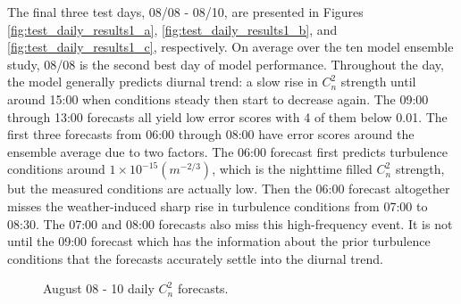 The final three test days, 08/08 - 08/10, are presented in Figures \ref{fig:test_daily_results1_a}, \ref{fig:test_daily_results1_b}, and \ref{fig:test_daily_results1_c}, respectively. On average over the ten model ensemble study, 08/08 is the second best day of model performance. Throughout the day, the model generally predicts diurnal trend: a slow rise in $C_{n}^{2}$ strength until around 15:00 when conditions steady then start to decrease again. The 09:00 through 13:00 forecasts all yield low error scores with 4 of them below 0.01. The first three forecasts from 06:00 through 08:00 have error scores around the ensemble average due to two factors. The 06:00 forecast first predicts turbulence conditions around $1 \times 10^{-15} (m^{-2/3})$, which is the nighttime filled $C_{n}^{2}$ strength, but the measured conditions are actually low. Then the 06:00 forecast altogether misses the weather-induced sharp rise in turbulence conditions from 07:00 to 08:30. The 07:00 and 08:00 forecasts also miss this high-frequency event. It is not until the 09:00 forecast which has the information about the prior turbulence conditions that the forecasts accurately settle into the diurnal trend.
\begin{figure}[h!]
	\centering
	\hfill
	\hfill
	\caption{August 08 - 10 daily $C_{n}^{2}$ forecasts.}
	\label{fig:test_daily_results1}
\end{figure}

